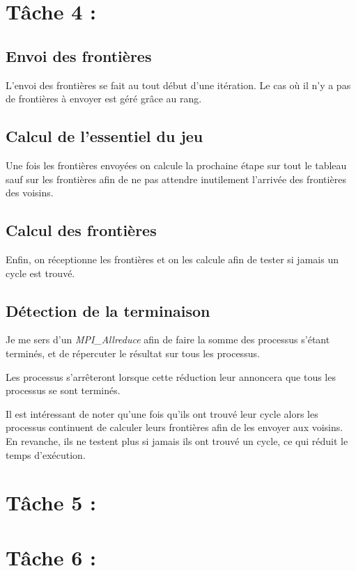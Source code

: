 \documentclass{article}
\begin{document}
\section*{Tâche 4 :}

\subsection{Envoi des frontières}

L'envoi des frontières se fait au tout début d'une itération. Le cas où il n'y a pas de frontières à envoyer est géré grâce au rang.

\subsection{Calcul de l'essentiel du jeu}

Une fois les frontières envoyées on calcule la prochaine étape sur tout le tableau sauf sur les frontières afin de ne pas attendre inutilement l'arrivée des frontières des voisins.

\subsection{Calcul des frontières}

Enfin, on réceptionne les frontières et on les calcule afin de tester si jamais un cycle est trouvé.

\subsection{Détection de la terminaison}

Je me sers d'un \textit{MPI\_Allreduce} afin de faire la somme des processus s'étant terminés, et de répercuter le résultat sur tous les processus.

Les processus s'arrêteront lorsque cette réduction leur annoncera que tous les processus se sont terminés.

\medskip

Il est intéressant de noter qu'une fois qu'ils ont trouvé leur cycle alors les processus continuent de calculer leurs frontières afin de les envoyer aux voisins. En revanche, ils ne testent plus si jamais ils ont trouvé un cycle, ce qui réduit le temps d'exécution.

\section*{Tâche 5 :}



\section*{Tâche 6 :}
\end{document}
